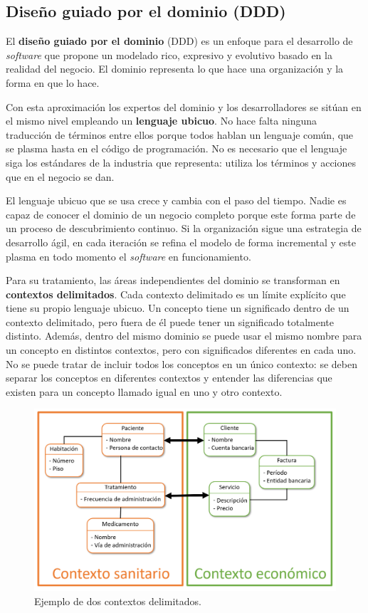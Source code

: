 \documentclass[11pt,spanish,listoffigures]{tfgetsinf}
\begin{document}
\subsection{Diseño guiado por el dominio (DDD)}

El \textbf{diseño guiado por el dominio} (DDD) \cite{Vaughn2013} es un enfoque para el desarrollo de \textit{software} que propone un modelado rico, expresivo y evolutivo basado en la realidad del negocio. El dominio representa lo que hace una organización y la forma en que lo hace.

Con esta aproximación los expertos del dominio y los desarrolladores se sitúan en el mismo nivel empleando un \textbf{lenguaje ubicuo}. No hace falta ninguna traducción de términos entre ellos porque todos hablan un lenguaje común, que se plasma hasta en el código de programación. No es necesario que el lenguaje siga los estándares de la industria que representa: utiliza los términos y acciones que en el negocio se dan.

El lenguaje ubicuo que se usa crece y cambia con el paso del tiempo. Nadie es capaz de conocer el dominio de un negocio completo porque este forma parte de un proceso de descubrimiento continuo. Si la organización sigue una estrategia de desarrollo ágil, en cada iteración se refina el modelo de forma incremental y este plasma en todo momento el \textit{software} en funcionamiento.

Para su tratamiento, las áreas independientes del dominio se transforman en \textbf{contextos delimitados}. Cada contexto delimitado es un límite explícito que tiene su propio lenguaje ubicuo. Un concepto tiene un significado dentro de un contexto delimitado, pero fuera de él puede tener un significado totalmente distinto. Además, dentro del mismo dominio se puede usar el mismo nombre para un concepto en distintos contextos, pero con significados diferentes en cada uno. No se puede tratar de incluir todos los conceptos en un único contexto: se deben separar los conceptos en diferentes contextos y entender las diferencias que existen para un concepto llamado igual en uno y otro contexto.

\begin{figure}[h]
\centering
\includegraphics[scale=0.6]{BoundedContexts}
\caption{Ejemplo de dos contextos delimitados.}
\label{fig:BoundedContexts}
\end{figure}
\end{document}
